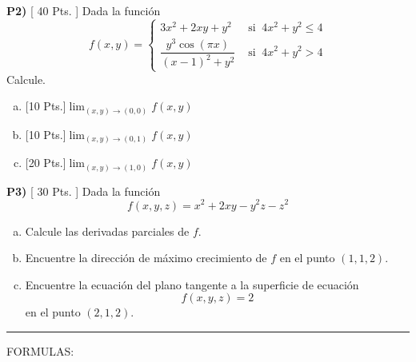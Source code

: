 \documentclass{article}
\begin{document}
\noindent\textbf{P2) } \textsf{[ 40 Pts. ]} Dada la función
  $$f(x,y) =\begin{cases}
    3x^2+2xy+y^2  & \textrm{ si }\ 4x^2+y^2\leq 4\\
    \dfrac{y^3\cos(\pi x)}{(x-1)^2+y^2}  & \textrm{ si }\ 4x^2+y^2>4
  \end{cases}$$
  Calcule.
  \begin{enumerate}[a)]
    \item \textsf{[10 Pts.]}$\displaystyle\lim_{(x,y)\to(0,0)}f(x,y)$
    \item \textsf{[10 Pts.]}$\displaystyle\lim_{(x,y)\to(0,1)}f(x,y)$
    \item \textsf{[20 Pts.]}$\displaystyle\lim_{(x,y)\to(1,0)}f(x,y)$
  \end{enumerate}


\vspace{5mm}
\noindent\textbf{P3) } \textsf{[ 30 Pts. ]} Dada la función
    $$f(x,y,z) = x^2+2xy-y^2z-z^2$$
  \begin{enumerate}[a)]
    \item Calcule las derivadas parciales de $f$.
    \item Encuentre la dirección de máximo crecimiento de $f$ en el punto $(1,1,2)$.
    \item Encuentre la ecuación del plano tangente a la superficie de ecuación
      $$f(x,y,z)=2$$
      en el punto $(2,1,2)$.
  \end{enumerate}


\vspace{10mm}
\noindent\rule{\textwidth}{0.4pt}

\vspace{2mm}
\thispagestyle{empty}
\noindent\textsf{\large FORMULAS:}
\vspace{3mm}
\end{document}
